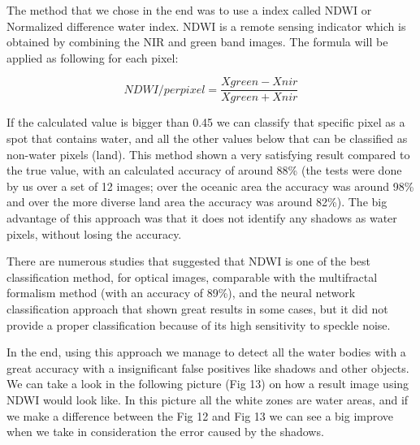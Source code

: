 \documentclass[12pt, a4paper]{report}
\begin{document}
The method that we chose in the end was to use a index called NDWI or Normalized difference water index. NDWI is a remote sensing indicator which is obtained by combining the NIR and green band images. The formula will be applied as following for each pixel:

$$ NDWI/perpixel = \frac{Xgreen - Xnir}{Xgreen + Xnir}$$

If the calculated value is bigger than 0.45 we can classify that specific pixel as a spot that contains water, and all the other values below that can be classified as non-water pixels (land). This method shown a very satisfying result compared to the true value, with an calculated accuracy of around 88\% (the tests were done by us over a set of 12 images; over the oceanic area the accuracy was around 98\% and over the more diverse land area the accuracy was around 82\%). The big advantage of this approach was that it does not identify any shadows as water pixels, without losing the accuracy. 
\par 
There are numerous studies \cite{NDWI, NDWI Comparison} that suggested that NDWI is one of the best classification method, for optical images, comparable with the multifractal formalism method (with an accuracy of 89\%), and the neural network classification approach that shown great results in some cases, but it did not provide a proper classification because of its high sensitivity to speckle noise.
\par 

In the end, using this approach we manage to detect all the water bodies with a great accuracy with a insignificant false positives like shadows and other objects. We can take a look in the following picture (Fig 13) on how a result image using NDWI would look like. In this picture all the white zones are water areas, and if we make a difference between the Fig 12 and Fig 13 we can see a big improve when we take in consideration the error caused by the shadows.
\par 
\end{document}
